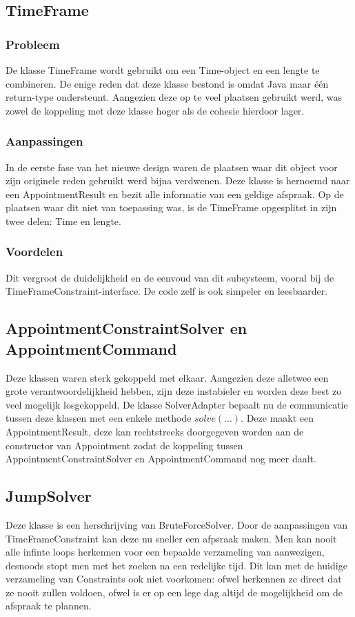 \subsection{TimeFrame}
\subsubsection{Probleem}
De klasse TimeFrame wordt gebruikt om een Time-object en een lengte te combineren. 
De enige reden dat deze klasse bestond is omdat Java maar één return-type ondersteunt. 
Aangezien deze op te veel plaatsen gebruikt werd, was zowel de koppeling met deze klasse hoger als de cohesie hierdoor lager. 

\subsubsection{Aanpassingen}
In de eerste fase van het nieuwe design waren de plaatsen waar dit object voor zijn originele reden gebruikt werd bijna verdwenen. 
Deze klasse is hernoemd naar een AppointmentResult en bezit alle informatie van een geldige afspraak. 
Op de plaatsen waar dit niet van toepassing was, is de TimeFrame opgesplitst in zijn twee delen: Time en lengte.

\subsubsection{Voordelen}
Dit vergroot de duidelijkheid en de eenvoud van dit subsysteem, vooral bij de TimeFrameConstraint-interface. 
De code zelf is ook simpeler en leesbaarder. 

\subsection{AppointmentConstraintSolver en AppointmentCommand}
Deze klassen waren sterk gekoppeld met elkaar. 
Aangezien deze alletwee een grote verantwoordelijkheid hebben, zijn deze instabieler en worden deze best zo veel mogelijk losgekoppeld. 
De klasse SolverAdapter bepaalt nu de communicatie tussen deze klassen met een enkele methode $solve(...)$. 
Deze maakt een AppointmentResult, deze kan rechtstreeks doorgegeven worden aan de constructor van Appointment zodat de koppeling tussen AppointmentConstraintSolver en AppointmentCommand nog meer daalt. 

\subsection{JumpSolver}
Deze klasse is een herschrijving van BruteForceSolver. 
Door de aanpassingen van TimeFrameConstraint kan deze nu sneller een afpsraak maken. 
Men kan nooit alle infinte loops herkennen voor een bepaalde verzameling van aanwezigen, desnoods stopt men met het zoeken na een redelijke tijd.
Dit kan met de huidige verzameling van Constraints ook niet voorkomen: ofwel herkennen ze direct dat ze nooit zullen voldoen, ofwel is er op een lege dag altijd de mogelijkheid om de afspraak te plannen.


